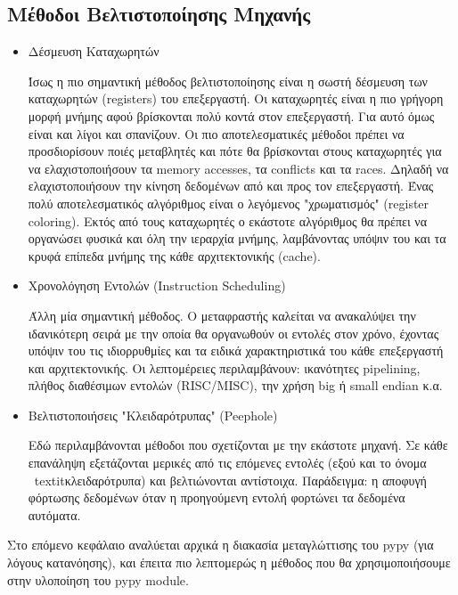 \subsection{Μέθοδοι Βελτιστοποίησης Μηχανής}

\begin{itemize}

\item Δέσμευση Καταχωρητών

Ίσως η πιο σημαντική μέθοδος βελτιστοποίησης είναι η σωστή δέσμευση των
καταχωρητών (registers) του επεξεργαστή. Οι καταχωρητές είναι η πιο γρήγορη
μορφή μνήμης αφού βρίσκονται πολύ κοντά στον επεξεργαστή. Για αυτό όμως είναι
και λίγοι και σπανίζουν. Οι πιο αποτελεσματικές μέθοδοι πρέπει να προσδιορίσουν
ποιές μεταβλητές και πότε θα βρίσκονται στους καταχωρητές για να
ελαχιστοποιήσουν τα memory accesses, τα conflicts και τα races. Δηλαδή να
ελαχιστοποιήσουν την κίνηση δεδομένων από και προς τον επεξεργαστή. Ένας πολύ
αποτελεσματικός αλγόριθμος είναι ο λεγόμενος "χρωματισμός" (register  coloring).
Εκτός από τους καταχωρητές ο εκάστοτε αλγόριθμος θα πρέπει να  οργανώσει φυσικά
και όλη την ιεραρχία μνήμης, λαμβάνοντας υπόψιν του και τα  κρυφά επίπεδα μνήμης
της κάθε αρχιτεκτονικής (cache).

\item Χρονολόγηση Εντολών (Instruction Scheduling)

Άλλη μία σημαντική μέθοδος. Ο μεταφραστής καλείται να ανακαλύψει την 
ιδανικότερη σειρά με την οποία θα οργανωθούν οι εντολές στον χρόνο, έχοντας 
υπόψιν του τις ιδιορρυθμίες και τα ειδικά χαρακτηριστικά του κάθε επεξεργαστή 
και αρχιτεκτονικής. Οι λεπτομέρειες περιλαμβάνουν: ικανότητες pipelining, 
πλήθος διαθέσιμων εντολών (RISC/MISC), την χρήση big ή small endian κ.α.

\item Βελτιστοποιήσεις "Κλειδαρότρυπας" (Peephole)

Εδώ περιλαμβάνονται μέθοδοι που σχετίζονται με την εκάστοτε μηχανή. Σε κάθε 
επανάληψη εξετάζονται μερικές από τις επόμενες εντολές (εξού και το όνομα \
textit{κλειδαρότρυπα}) και βελτιώνονται αντίστοιχα. Παράδειγμα: η αποφυγή 
φόρτωσης δεδομένων όταν η προηγούμενη εντολή φορτώνει τα δεδομένα αυτόματα.

\end{itemize}

Στο επόμενο κεφάλαιο αναλύεται αρχικά η διακασία μεταγλώττισης του pypy (για
λόγους κατανόησης), και έπειτα πιο λεπτομερώς η μέθοδος που θα
χρησιμοποιήσουμε στην υλοποίηση του pypy module.

